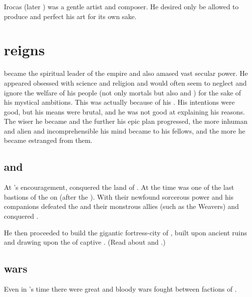 Irocas (later \Secherdamon) was a gentle artist and composer. 
He desired only be allowed to produce and perfect his art for its own sake. 













\section{\Sethicus reigns}
\Sethicus became the spiritual leader of the \ophidian empire and also amased vast secular power. 
He appeared obsessed with science and religion and would often seem to neglect and ignore the welfare of his people (not only mortals but also \ophidians and \dragons) for the sake of his mystical ambitions. 
This was actually because of his . 
His intentions were good, but his means were brutal, and he was not good at explaining his reasons. 
The wiser he became and the further his epic plan progressed, the more inhuman and alien and incomprehensible his mind became to his fellows, and the more he became estranged from them. 









\subsection{\Nom and \Baltherium}
At \Achamoth's encouragement, \Sethicus conquered the land of \Nom. 
At the time \Nom was one of the last bastions of the \moonthings on \Miith (after the \ophidians {}). 
With their newfound sorcerous power \Sethicus and his companions defeated the \moonthings and their monstrous allies (such as the Weavers) and conquered \Nom. 

He then proceeded to build the gigantic fortress-city of , built upon ancient \moonthing ruins and drawing upon the \dweomers of captive \moongods. 
(Read about \Baltherium and \Nom.)









\subsection{\Dragon wars}
Even in \Sethicus's time there were great and bloody wars fought between factions of \dragons.

